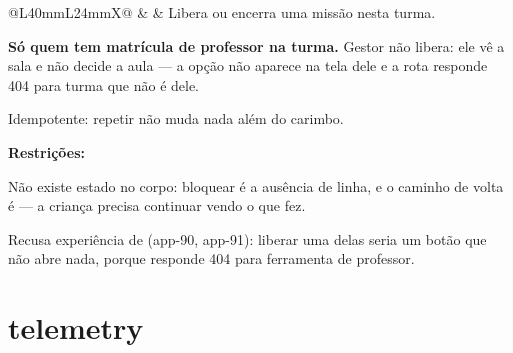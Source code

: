 \begin{tabularx}{\linewidth}{@{}L{40mm}L{24mm}X@{}}
 &  & Libera ou encerra uma missão nesta turma.\par \textbf{Só quem tem matrícula de professor na turma.} Gestor não libera: ele vê a sala e não decide a aula --- a opção não aparece na tela dele e a rota responde 404 para turma que não é dele.\par Idempotente: repetir não muda nada além do carimbo.\par \textbf{Restrições:}\par \hspace*{1em}\textbullet{} Não existe estado  no corpo: bloquear é a ausência de linha, e o caminho de volta é  --- a criança precisa continuar vendo o que fez.\par \hspace*{1em}\textbullet{} Recusa experiência de  (app-90, app-91): liberar uma delas seria um botão que não abre nada, porque  responde 404 para ferramenta de professor.\\
\bottomrule
\end{tabularx}

\section{telemetry}

